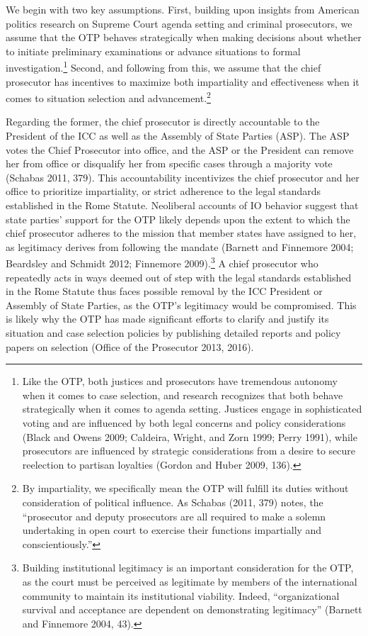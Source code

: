 We begin with two key assumptions. First, building upon insights from American politics research on Supreme Court agenda setting and criminal prosecutors, we assume that the OTP behaves strategically when making decisions about whether to initiate preliminary examinations or advance situations to formal investigation.\footnote{Like the OTP, both justices and prosecutors have tremendous autonomy when it comes to case selection, and research recognizes that both behave strategically when it comes to agenda setting. Justices engage in sophisticated voting and are influenced by both legal concerns and policy considerations (Black and Owens 2009; Caldeira, Wright, and Zorn 1999; Perry 1991), while prosecutors are influenced by strategic considerations from a desire to secure reelection to partisan loyalties (Gordon and Huber 2009, 136).} Second, and following from this, we assume that the chief prosecutor has incentives to maximize both impartiality and effectiveness when it comes to situation selection and advancement.\footnote{By impartiality, we specifically mean the OTP will fulfill its duties without consideration of political influence. As Schabas (2011, 379) notes, the ``prosecutor and deputy prosecutors are all required to make a solemn undertaking in open court to exercise their functions impartially and conscientiously.''}

Regarding the former, the chief prosecutor is directly accountable to the President of the ICC as well as the Assembly of State Parties (ASP). The ASP votes the Chief Prosecutor into office, and the ASP or the President can remove her from office or disqualify her from specific cases through a majority vote (Schabas 2011, 379). This accountability incentivizes the chief prosecutor and her office to prioritize impartiality, or strict adherence to the legal standards established in the Rome Statute. Neoliberal accounts of IO behavior suggest that state parties' support for the OTP likely depends upon the extent to which the chief prosecutor adheres to the mission that member states have assigned to her, as legitimacy derives from following the mandate (Barnett and Finnemore 2004; Beardsley and Schmidt 2012; Finnemore 2009).\footnote{Building institutional legitimacy is an important consideration for the OTP, as the court must be perceived as legitimate by members of the international community to maintain its institutional viability. Indeed, ``organizational survival and acceptance are dependent on demonstrating legitimacy'' (Barnett and Finnemore 2004, 43).} A chief prosecutor who repeatedly acts in ways deemed out of step with the legal standards established in the Rome Statute thus faces possible removal by the ICC President or Assembly of State Parties, as the OTP's legitimacy would be compromised. This is likely why the OTP has made significant efforts to clarify and justify its situation and case selection policies by publishing detailed reports and policy papers on selection (Office of the Prosecutor 2013, 2016).

